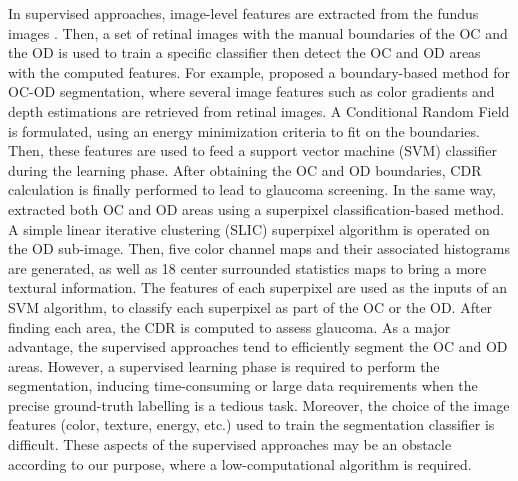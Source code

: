 In supervised approaches, image-level features are extracted from the fundus images \citep{wong}. Then, a set of retinal images with the manual boundaries of the OC and the OD is used to train a specific classifier then detect the OC and OD areas with the computed features.
For example, \citet{chakravarty} proposed a boundary-based method for OC-OD segmentation, where several image features such as color gradients and depth estimations are retrieved from retinal images. A Conditional Random Field is formulated, using an energy minimization criteria to fit on the boundaries. Then, these features are used to feed a support vector machine (SVM) classifier during the learning phase. After obtaining the OC and OD boundaries, CDR calculation is finally performed to lead to glaucoma screening.
In the same way, \citet{cheng} extracted both OC and OD areas using a superpixel classification-based method. A simple linear iterative clustering (SLIC) superpixel  algorithm \citep{slic} is operated on the OD sub-image. Then, five color channel maps and their associated histograms are generated, as well as 18 center surrounded statistics maps to bring a more textural information. The features of each superpixel are used as the inputs of an SVM algorithm, to classify each superpixel as part of the OC or the OD. After finding each area, the CDR is computed to assess glaucoma.
As a major advantage, the supervised approaches tend to efficiently segment the OC and OD areas. However, a supervised learning phase is required to perform the segmentation, inducing time-consuming or large data requirements when the precise ground-truth labelling is a tedious task. Moreover, the choice of the image features (color, texture, energy, etc.) used to train the segmentation classifier is difficult. These aspects of the supervised approaches may be an obstacle according to our purpose, where a low-computational algorithm is required. 

